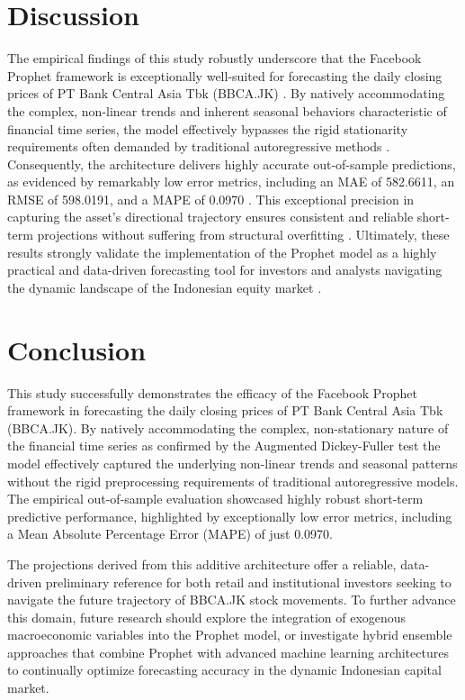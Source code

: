 \documentclass[11pt,twoside]{article}
\begin{document}
\FloatBarrier

\section{Discussion}
The empirical findings of this study robustly underscore that the Facebook Prophet framework is exceptionally well-suited for forecasting the daily closing prices of PT Bank Central Asia Tbk (BBCA.JK) \cite{taylor2018, chatterjee2020}. By natively accommodating the complex, non-linear trends and inherent seasonal behaviors characteristic of financial time series, the model effectively bypasses the rigid stationarity requirements often demanded by traditional autoregressive methods \cite{makridakis2018}. Consequently, the architecture delivers highly accurate out-of-sample predictions, as evidenced by remarkably low error metrics, including an MAE of 582.6611, an RMSE of 598.0191, and a MAPE of 0.0970 \cite{hyndman2006}. This exceptional precision in capturing the asset's directional trajectory ensures consistent and reliable short-term projections without suffering from structural overfitting \cite{garlapati2021}. Ultimately, these results strongly validate the implementation of the Prophet model as a highly practical and data-driven forecasting tool for investors and analysts navigating the dynamic landscape of the Indonesian equity market \cite{setiawan2023}.

\section{Conclusion}
This study successfully demonstrates the efficacy of the Facebook Prophet framework in forecasting the daily closing prices of PT Bank Central Asia Tbk (BBCA.JK). By natively accommodating the complex, non-stationary nature of the financial time series as confirmed by the Augmented Dickey-Fuller test the model effectively captured the underlying non-linear trends and seasonal patterns without the rigid preprocessing requirements of traditional autoregressive models. The empirical out-of-sample evaluation showcased highly robust short-term predictive performance, highlighted by exceptionally low error metrics, including a Mean Absolute Percentage Error (MAPE) of just 0.0970. 

The projections derived from this additive architecture offer a reliable, data-driven preliminary reference for both retail and institutional investors seeking to navigate the future trajectory of BBCA.JK stock movements. To further advance this domain, future research should explore the integration of exogenous macroeconomic variables into the Prophet model, or investigate hybrid ensemble approaches that combine Prophet with advanced machine learning architectures to continually optimize forecasting accuracy in the dynamic Indonesian capital market.


\printbibliography
\end{document}
